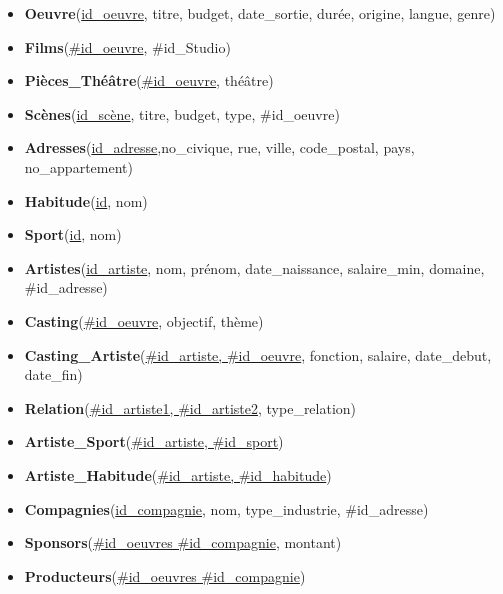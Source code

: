 \documentclass{article}
\begin{document}
\begin{itemize}
\item \textbf{Oeuvre}(\underline{id\_oeuvre}, titre, budget,
  date\_sortie, durée, origine, langue, genre)
  
\item \textbf{Films}(\underline{\#id\_oeuvre}, \#id\_Studio)
  
\item \textbf{Pièces\_Théâtre}(\underline{\#id\_oeuvre}, théâtre)
  
\item \textbf{Scènes}(\underline{id\_scène}, titre, budget, type,
  \#id\_oeuvre)
  
\item \textbf{Adresses}(\underline{id\_adresse},no\_civique, rue,
  ville, code\_postal, pays, no\_appartement)

\item \textbf{Habitude}(\underline{id}, nom)

\item \textbf{Sport}(\underline{id}, nom)
  
\item \textbf{Artistes}(\underline{id\_artiste}, nom, prénom,
  date\_naissance, salaire\_min, domaine, \#id\_adresse)
  
\item \textbf{Casting}(\underline{\#id\_oeuvre}, objectif, thème)

\item \textbf{Casting\_Artiste}(\underline{\#id\_artiste, \#id\_oeuvre}, fonction,
  salaire, date\_debut, date\_fin)

\item \textbf{Relation}(\underline{\#id\_artiste1, \#id\_artiste2}, type\_relation)

\item \textbf{Artiste\_Sport}(\underline{\#id\_artiste, \#id\_sport})

\item \textbf{Artiste\_Habitude}(\underline{\#id\_artiste, \#id\_habitude})

\item \textbf{Compagnies}(\underline{id\_compagnie}, nom,
  type\_industrie, \#id\_adresse)
  
\item \textbf{Sponsors}(\underline{\#id\_oeuvres \#id\_compagnie},
  montant)
  
\item \textbf{Producteurs}(\underline{\#id\_oeuvres
    \#id\_compagnie})

\end{itemize}
\end{document}
